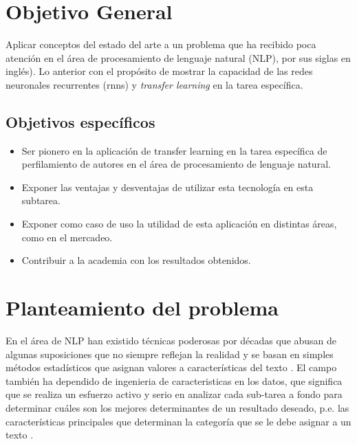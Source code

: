 
\section{Objetivo General}

Aplicar conceptos del estado del arte a un problema que ha recibido poca atención en el área de \gls{procesamiento de lenguaje natural} (NLP), por sus siglas en inglés). Lo anterior con el propósito de mostrar la capacidad de las redes neuronales recurrentes (\glspl{rnn}) y \textit{\gls{transfer learning}} en la tarea específica.

\subsection{Objetivos específicos}

\begin{itemize}
\item Ser pionero en la aplicación de transfer learning en la tarea específica de perfilamiento de autores en el área de procesamiento de lenguaje natural.
\item Exponer las ventajas y desventajas de utilizar esta tecnología en esta subtarea.
\item Exponer como caso de uso la utilidad de esta aplicación en distintas áreas, como en el mercadeo.
\item Contribuir a la academia con los resultados obtenidos.
\end{itemize}


\section{Planteamiento del problema}

En el área de NLP han existido técnicas poderosas por décadas que abusan de algunas suposiciones que no siempre reflejan la realidad y se basan en simples métodos estadísticos que asignan valores a características del texto \parencite{Edmundson1969, kupiec1995trainable}. El campo también ha dependido de \gls{ingenieria de caracteristicas} en los datos, que significa que se realiza un esfuerzo activo y serio en analizar cada sub-tarea a fondo para determinar cuáles son los mejores determinantes de un resultado deseado, p.e. las características principales que determinan la categoría que se le debe asignar a un texto \parencite{aggarwal2012mining}.

